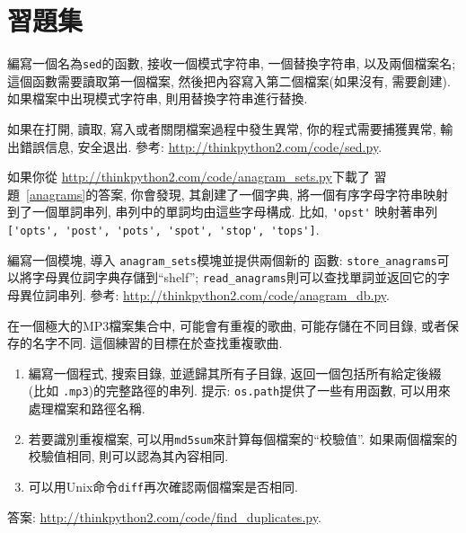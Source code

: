 \documentclass[10pt]{book}
\begin{document}
\section{習題集}

\begin{exercise}

編寫一個名為{\tt sed}的函數, 接收一個模式字符串, 一個替換字符串, 以及兩個檔案名;
這個函數需要讀取第一個檔案, 然後把內容寫入第二個檔案(如果沒有, 需要創建).
如果檔案中出現模式字符串, 則用替換字符串進行替換. 

如果在打開, 讀取, 寫入或者關閉檔案過程中發生異常, 
你的程式需要捕獲異常, 輸出錯誤信息, 安全退出. 
參考: \url{http://thinkpython2.com/code/sed.py}.

\end{exercise}


\begin{exercise}

如果你從 \url{http://thinkpython2.com/code/anagram_sets.py}下載了
習題~\ref{anagrams}的答案, 你會發現, 
其創建了一個字典, 將一個有序字母字符串映射到了一個單詞串列, 
串列中的單詞均由這些字母構成. 比如,
\verb"'opst'" 映射著串列
\verb"['opts', 'post', 'pots', 'spot', 'stop', 'tops']".

編寫一個模塊, 導入 \verb"anagram_sets"模塊並提供兩個新的
函數: \verb"store_anagrams"可以將字母異位詞字典存儲到``shelf''; 
\verb"read_anagrams"則可以查找單詞並返回它的字母異位詞串列. 
參考: \url{http://thinkpython2.com/code/anagram_db.py}.

\end{exercise}


\begin{exercise}
\label{checksum}

在一個極大的MP3檔案集合中, 可能會有重複的歌曲, 可能存儲在不同目錄, 
或者保存的名字不同. 
這個練習的目標在於查找重複歌曲. 

\begin{enumerate}

\item 編寫一個程式, 搜索目錄, 並遞歸其所有子目錄, 
返回一個包括所有給定後綴 (比如 {\tt .mp3})的完整路徑的串列. 
提示: {\tt os.path}提供了一些有用函數, 可以用來處理檔案和路徑名稱. 

\item 若要識別重複檔案, 可以用{\tt md5sum}來計算每個檔案的``校驗值''. 
如果兩個檔案的校驗值相同, 則可以認為其內容相同. 

\item 可以用Unix命令{\tt diff}再次確認兩個檔案是否相同. 

\end{enumerate}

答案: \url{http://thinkpython2.com/code/find_duplicates.py}.

\end{exercise}
\end{document}

